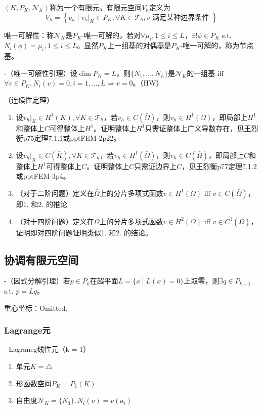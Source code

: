$(K, P_K, \mathcal{N}_K)$称为一个有限元。有限元空间$V_h$定义为
\[
  V_{h}=\left\{v_{h} \mid v_{h}|_{K} \in P_{K}, \forall K \in \mathcal{T}_{h}, v \text { 满足某种边界条件 }\right\}
\]

唯一可解性：称$\mathcal{N}_{K}$是$P_{K}$-唯一可解的，若对$\forall \mu_{i}, 1 \le i \le L$，$\exists ! \phi \in P_{K}$ s.t. $N_{i}(\phi)=\mu_{i}, 1 \le i \le L$。显然$P_{K}$上一组基的对偶基是$P_{K}$-唯一可解的，称为节点基。

-（唯一可解性引理）设$\dim P_K = L$，则$\{N_1, \dots, N_L\}$是$\mathcal{N}_K$的一组基 iff $\forall v \in P_K, N_i(v) = 0, i = 1, \dots, L \Rightarrow v = 0$。（HW）

\begin{thm}（连续性定理）
  \begin{enumerate}
    \item 设$v_h|_K \in H^{1}(K), \forall K \in \mathcal{T}_{h}$，若$v_h \in C(\bar{\Omega})$，则$v_h \in H^{1}(\Omega)$，即局部上$H^1$和整体上$C$可得整体上$H^1$。证明整体上$H^1$只需证整体上广义导数存在，见王烈衡p75定理7.1.1或pptFEM-2p22。
    \item 设$v_h|_K \in C(\bar{K}), \forall K \in \mathcal{T}_{h}$，若$v_h \in H^1(\bar{\Omega})$，则$v_h \in C(\bar{\Omega})$，即局部上$C$和整体上$H^1$可得整体上$C$。证明整体上$C$只需证边界上$C$，见王烈衡p77定理7.1.2或pptFEM-3p4。
    \item （对于二阶问题）定义在$\bar{\Omega}$上的分片多项式函数$v \in H^1(\Omega)$ iff $v \in C(\bar{\Omega})$，即1. 和2. 的推论
    \item （对于四阶问题）定义在$\bar{\Omega}$上的分片多项式函数$v \in H^2(\Omega)$ iff $v \in C^1(\bar{\Omega})$，证明即对四阶问题证明类似1. 和2. 的结论。
  \end{enumerate}
\end{thm}

\subsection{协调有限元空间}

-（因式分解引理）若$p \in P_k$在超平面$L = \{x \mid L(x) = 0\}$上取零，则$\exists q \in P_{k - 1}$ s.t. $p = Lq$。

重心坐标：Omitted.

\subsubsection{Lagrange元}

- Lagraneg线性元（k = 1）
\begin{enumerate}
  \item 单元$K = \triangle$
  \item 形函数空间$P_K = P_1(K)$
  \item 自由度$\mathcal{N}_K = \{N_{3}\}, N_i(v) = v(a_i)$
\end{enumerate}

